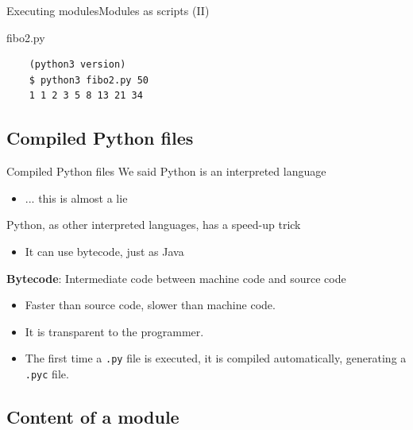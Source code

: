 \documentclass[10pt,compress]{beamer} %
\begin{document}
\begin{frame}{Executing modules}{Modules as scripts (II)}
	\vspace{-0.3cm}
	\begin{block}{fibo2.py}
	\vspace{-0.2cm}
	
	\vspace{-0.2cm}
	\end{block}

	\begin{block}{}
	\vspace{-0.2cm}
	\begin{verbatim}
    (python3 version)	
	$ python3 fibo2.py 50
	1 1 2 3 5 8 13 21 34
	\end{verbatim}
	\vspace{-0.2cm}
	\end{block}
\end{frame}

\subsection{Compiled Python files}
\begin{frame}{Compiled Python files}{}
	We said Python is an interpreted language
		\begin{itemize}
		\item ... this is almost a lie
		\end{itemize}
	Python, as other interpreted languages, has a speed-up trick
		\begin{itemize}
		\item It can use bytecode, just as Java
		\end{itemize}
	\textbf{Bytecode}: Intermediate code between machine code and source code
		\begin{itemize}
		\item Faster than source code, slower than machine code.
		\item It is transparent to the programmer.
		\item The first time a \texttt{.py} file is executed, it is compiled automatically, generating a \texttt{.pyc} file.
		\end{itemize}
\end{frame}

\subsection{Content of a module}
\end{document}
